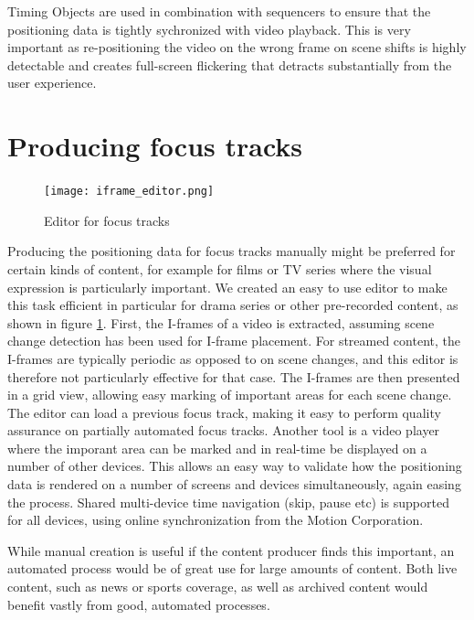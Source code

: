 \documentclass[sigconf, review=true]{acmart}
\begin{document}
Timing Objects \cite{Arntzen2018,timingobject} are used in combination with
sequencers \cite{sequencer} to ensure that the positioning data is tightly
sychronized with video playback. This is very important as re-positioning
the video on the wrong frame on scene shifts is highly detectable and creates
full-screen flickering that detracts substantially from the user experience.


\section{Producing focus tracks}

\begin{figure}
\begin{center}
\texttt{[image: iframe\_editor.png]}
\caption{Editor for focus tracks}
\label{iframe_editor}
\end{center}
\end{figure}

Producing the positioning data for focus tracks manually might be preferred
for certain kinds of content, for example for films or TV series where the
visual expression is particularly important. We created an easy to use editor
to make this task efficient in particular for drama series or other
pre-recorded content, as shown in figure \ref{iframe_editor}. First, the
I-frames of a video is extracted, assuming scene change detection has been
used for I-frame placement. For streamed content, the I-frames are typically
periodic as opposed to on scene changes, and this editor is therefore not
particularly effective for that case. The I-frames are then presented in a
grid view, allowing easy marking of important areas for each scene change.
The editor can load a previous focus track, making it easy to perform quality
assurance on partially automated focus tracks. Another tool is a video
player where the imporant area can be marked and in real-time be displayed
on a number of other devices. This allows an easy way to validate how the
positioning data is rendered on a number of screens and devices
simultaneously, again easing the process. Shared multi-device time navigation
(skip, pause etc) is supported for all devices, using online synchronization
from the Motion Corporation\cite{inMotion}.

While manual creation is useful if the content producer finds this important,
an automated process would be of great use for large amounts of content. Both
live content, such as news or sports coverage, as well as archived content
would benefit vastly from good, automated processes.
\end{document}
